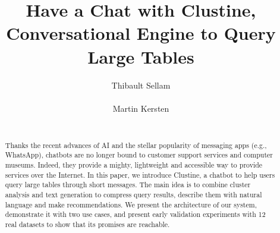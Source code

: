 \documentclass{sig-alternate}
\begin{document}
\title{Have a Chat with Clustine,\\Conversational Engine to Query Large Tables}

\author{
\alignauthor
Thibault Sellam\\
       \\
\alignauthor
Martin Kersten\\
       \\
}

\maketitle
\begin{abstract} 
Thanks the recent advances of AI and the stellar popularity of messaging apps
(e.g., WhatsApp), chatbots are no longer bound to customer support services and
computer museums. Indeed, they provide a mighty, lightweight and accessible
way to provide services over the Internet.  In this paper, we introduce
Clustine, a chatbot to help users query large tables through short messages. The
main idea is to combine cluster analysis and text generation to compress query
results, describe them with natural language and make re\-commendations. We
present the architecture of our system, demonstrate it with two use cases, and
present early validation experiments with 12 real datasets to show that its
promises are reachable.
\end{abstract}



\small


\end{document}
